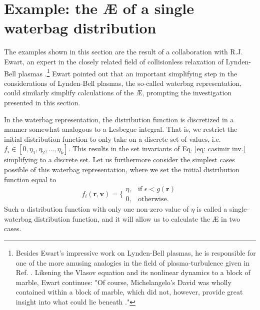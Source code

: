 \section*{Example: the \AE{} of a single waterbag distribution}
The examples shown in this section are the result of a collaboration with R.J. Ewart, an expert in the closely related field of collisionless relaxation of Lynden-Bell plasmas \cite{ewart2022collisionless,ewart2023non}.\footnote{Besides Ewart's impressive work on Lynden-Bell plasmas, he is responsible for one of the more amusing analogies in the field of plasma-turbulence given in Ref. \cite{ewart2022collisionless}. Likening the Vlasov equation and its nonlinear dynamics to a block of marble, Ewart continues: "Of course, Michelangelo's David was wholly contained within a block of marble, which did not, however, provide great insight into what could lie beneath \cite{coonin2014marble}."} Ewart pointed out that an important simplifying step in the considerations of Lynden-Bell plasmas, the so-called waterbag representation, could similarly simplify calculations of the \AE{}, prompting the investigation presented in this section. \par 
In the waterbag representation, the distribution function is discretized in a manner somewhat analogous to a Lesbegue integral. That is, we restrict the initial distribution function to only take on a discrete set of values, i.e. $f_i \in [0,\eta_1,\eta_2,\dots,\eta_k]$. This results in the set invariants of Eq. \eqref{eq: casimir inv.} simplifying to a discrete set. Let us furthermore consider the simplest cases possible of this waterbag representation, where we set the initial distribution function equal to
\begin{equation}
f_i(\boldsymbol{r},\boldsymbol{v}) = 
\Bigg\{
    \begin{array}{lr}
        \eta, & \text{if } \epsilon < g(\boldsymbol{r})\\
        0, & \text{otherwise}.
    \end{array}
\end{equation}
Such a distribution function with only one non-zero value of $\eta$ is called a single-waterbag distribution function, and it will allow us to calculate the \AE{} in two cases.

